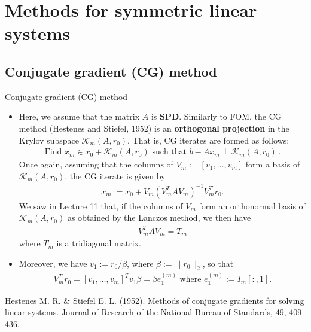 \documentclass[t,usepdftitle=false]{beamer}
\begin{document}
\section{Methods for symmetric linear systems}

\subsection{Conjugate gradient (CG) method}
\begin{frame}{Conjugate gradient (CG) method}
\begin{itemize}
\item Here, we assume that the matrix $A$ is \textbf{SPD}.
Similarly to FOM, the CG method (Hestenes and Stiefel, 1952) is an \textbf{orthogonal projection} in the Krylov subspace $\mathcal{K}_m(A,r_0)$.
That is, CG iterates are formed as follows:
\begin{align*}
\boxed{
\text{Find }x_m\in x_0+\mathcal{K}_m(A,r_0)
\text{ such that }
b-Ax_m\perp\mathcal{K}_m(A,r_0)
}\,.
\end{align*}
Once again, assuming that the columns of $V_m:=[v_1,\dots,v_m]$ form a basis of $\mathcal{K}_m(A,r_0)$, the CG iterate is given by
\begin{align*}
x_m:=x_0+V_m(V_m^TAV_m)^{-1}V_m^Tr_0.
\end{align*}
We saw in Lecture 11 that, if the columns of $V_m$ form an orthonormal basis of $\mathcal{K}_m(A,r_0)$ as obtained by the Lanczos method, we then have
\begin{align*}
V_m^TAV_m=T_m
\end{align*}
where $T_m$ is a tridiagonal matrix.
\item[] Moreover, we have $v_1:=r_0/\beta$, where $\beta:=\|r_0\|_2$, so that\vspace{-.1cm}
\begin{align*}
V_m^Tr_0=[v_1,\dots,v_m]^Tv_1\beta=\beta e_1^{(m)}
\text{ where }
e_1^{(m)}:=I_m[:,1].
\end{align*}
\end{itemize}%
\tiny{Hestenes M. R. \& Stiefel E. L. (1952). Methods of conjugate gradients for solving linear systems. Journal of Research of the National Bureau of Standards, 49, 409–436.}
\end{frame}
\end{document}
